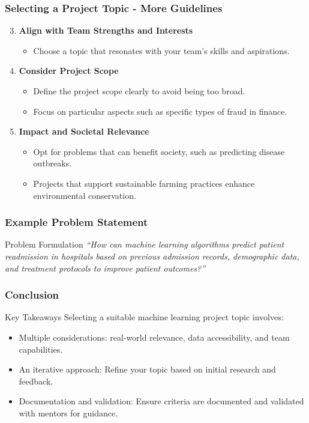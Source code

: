 \documentclass[aspectratio=169]{beamer}
\begin{document}
\begin{frame}[fragile]
    \frametitle{Selecting a Project Topic - More Guidelines}
    \begin{enumerate}
        \setcounter{enumi}{2}
        \item \textbf{Align with Team Strengths and Interests}
        \begin{itemize}
            \item Choose a topic that resonates with your team’s skills and aspirations.
        \end{itemize}

        \item \textbf{Consider Project Scope}
        \begin{itemize}
            \item Define the project scope clearly to avoid being too broad.
            \item Focus on particular aspects such as specific types of fraud in finance.
        \end{itemize}

        \item \textbf{Impact and Societal Relevance}
        \begin{itemize}
            \item Opt for problems that can benefit society, such as predicting disease outbreaks.
            \item Projects that support sustainable farming practices enhance environmental conservation.
        \end{itemize}
    \end{enumerate}
\end{frame}

\begin{frame}[fragile]
    \frametitle{Example Problem Statement}
    \begin{block}{Problem Formulation}
        \textit{“How can machine learning algorithms predict patient readmission in hospitals based on previous admission records, demographic data, and treatment protocols to improve patient outcomes?”}
    \end{block}
\end{frame}

\begin{frame}[fragile]
    \frametitle{Conclusion}
    \begin{block}{Key Takeaways}
        Selecting a suitable machine learning project topic involves:
        \begin{itemize}
            \item Multiple considerations: real-world relevance, data accessibility, and team capabilities.
            \item An iterative approach: Refine your topic based on initial research and feedback.
            \item Documentation and validation: Ensure criteria are documented and validated with mentors for guidance.
        \end{itemize}
    \end{block}
\end{frame}
\end{document}
